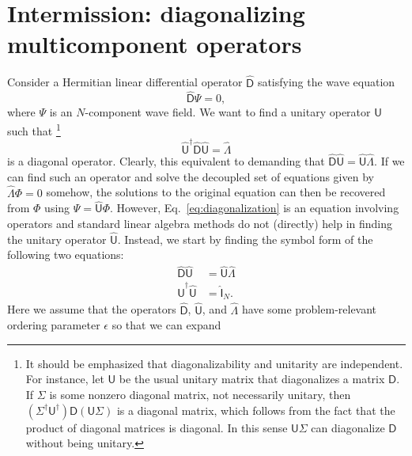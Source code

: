 \section{Intermission: diagonalizing multicomponent operators}

Consider a Hermitian linear differential operator $\widehat{\mathsf{D}}$ satisfying the wave equation
%
\begin{equation}
  \widehat{\mathsf{D}}\Psi = 0,
\end{equation}
%
where $\Psi$ is an $N$-component wave field.
%
We want to find a unitary operator ${\mathsf{U}}$ such that%
\footnote{It should be emphasized that diagonalizability and unitarity are independent. For instance, let $\mathsf{U}$ be the usual unitary matrix that diagonalizes a matrix $\mathsf{D}$.
  If $\Sigma$ is some nonzero diagonal matrix, not necessarily unitary, then $(\Sigma^{\dagger}\mathsf{U}^{\dagger})\mathsf{D}(\mathsf{U}\Sigma)$ is a diagonal matrix, which follows from the fact that the product of diagonal matrices is diagonal.
  In this sense $\mathsf{U}\Sigma$ can diagonalize $\mathsf{D}$ without being unitary.}
%
\begin{equation}
  \widehat{\mathsf{U}}^{\dagger}\widehat{\mathsf{D}}\widehat{\mathsf{U}} = \widehat{\Lambda}\label{eq:diagonalization}
\end{equation}
%
is a diagonal operator.
Clearly, this equivalent to demanding that $\widehat{\mathsf{D}}\widehat{\mathsf{U}} = \widehat{\mathsf{U}}\widehat{\Lambda}$.
If we can find such an operator and solve the decoupled set of equations given by $\widehat{\Lambda}\Phi = 0$ somehow,
the solutions to the original equation can then be recovered from $\Phi$ using $\Psi = \widehat{\mathsf{U}}\Phi$.
However, Eq.~\eqref{eq:diagonalization} is an equation involving operators and standard linear algebra methods do not (directly) help in finding the unitary operator $\widehat{\mathsf{U}}$.
Instead, we start by finding the symbol form of the following two equations:
%
\begin{equation}
  \begin{aligned}
    \widehat{\mathsf{D}}\widehat{\mathsf{U}} &= \widehat{\mathsf{U}}\widehat{\Lambda}\\
    \widehat{\mathsf{U}}^{\dagger}\widehat{\mathsf{U}} &= \widehat{\mathsf{I}}_{N}.
  \end{aligned}
  \label{eq:diagonal2}
\end{equation}
%
Here we assume that the operators $\widehat{\mathsf{D}}$, $\widehat{\mathsf{U}}$, and $\widehat{\Lambda}$ have some problem-relevant ordering parameter $\epsilon$ so that we can expand%

